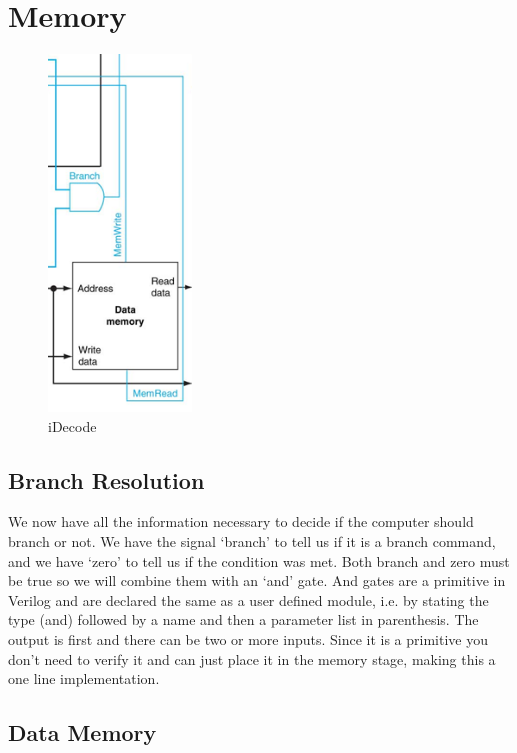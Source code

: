 \chapter{Memory}


\begin{figure}
\caption{iDecode}\label{fig:memory}
\begin{center}
\includegraphics[width=1.5in]{../images/pipeline_memory.png}
\end{center}
\end{figure}

\WrapBarrier

\section{Branch Resolution}

We now have all the information necessary to decide if the computer should branch or not.  We have the signal `branch' to tell us if it is a branch command, and we have `zero' to tell us if the condition was met.  Both branch and zero must be true so we will combine them with an `and' gate.  And gates are a primitive in Verilog and are declared the same as a user defined module, i.e. by stating the type (and) followed by a name and then a parameter list in parenthesis.  The output is first and there can be two or more inputs.  Since it is a primitive you don't need to verify it and can just place it in the memory stage, making this a one line implementation.

\section{Data Memory}

